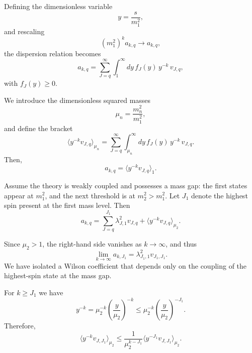 Defining the dimensionless variable
\begin{equation}
    y = \frac{s}{m_1^2},
\end{equation}
and rescaling
\begin{equation}
    (m_1^2)^k a_{k,q} \to a_{k,q},
\end{equation}
the dispersion relation becomes
\begin{equation}
    a_{k,q} =
    \sum_{J=q}^{\infty} 
    \int_{1}^{\infty} dy \, 
    f_J(y) \, y^{-k} \, v_{J,q},
\end{equation}
with $f_J(y)\geq 0$.


We introduce the dimensionless squared masses
\begin{equation}
    \mu_n = \frac{m_n^2}{m_1^2},
\end{equation}
and define the bracket
\begin{equation}
    \langle y^{-k} v_{J,q} \rangle_{\mu_n}
    =
    \sum_{J=q}^{\infty} 
    \int_{\mu_n}^{\infty} dy \,
    f_J(y) \, y^{-k} \, v_{J,q}.
\end{equation}
Then,
\begin{equation}
    a_{k,q} = \langle y^{-k} v_{J,q} \rangle_{1}.
\end{equation}

Assume the theory is weakly coupled and possesses a mass gap: the first states appear at $m_1^2$, and the next threshold is at $m_2^2 > m_1^2$. 
Let $J_1$ denote the highest spin present at the first mass level. Then
\begin{equation}
    a_{k,q} =
    \sum_{J=q}^{J_1} 
    \lambda_{J,1}^2 v_{J,q}
    +
    \langle y^{-k} v_{J,q} \rangle_{\mu_2}.
\end{equation}

Since $\mu_2>1$, the right-hand side vanishes as $k \to \infty$, and thus
\begin{equation}
    \lim_{k \to \infty} a_{k,J_1}
    =
    \lambda_{J_1,1}^2 v_{J_1,J_1}.
\end{equation}
We have isolated a Wilson coefficient that depends only on the coupling of the highest-spin state at the mass gap.

For $k \geq J_1$ we have
\begin{equation}
    y^{-k}
    =
    \mu_2^{-k}
    \left( \frac{y}{\mu_2} \right)^{-k}
    \leq
    \mu_2^{-k}
    \left( \frac{y}{\mu_2} \right)^{-J_1}.
\end{equation}
Therefore,
\begin{equation}
    \langle y^{-k} v_{J,J_1} \rangle_{\mu_2}
    \leq
    \frac{1}{\mu_2^{k-J_1}}
    \langle y^{-J_1} v_{J,J_1} \rangle_{\mu_2}.
\end{equation}

